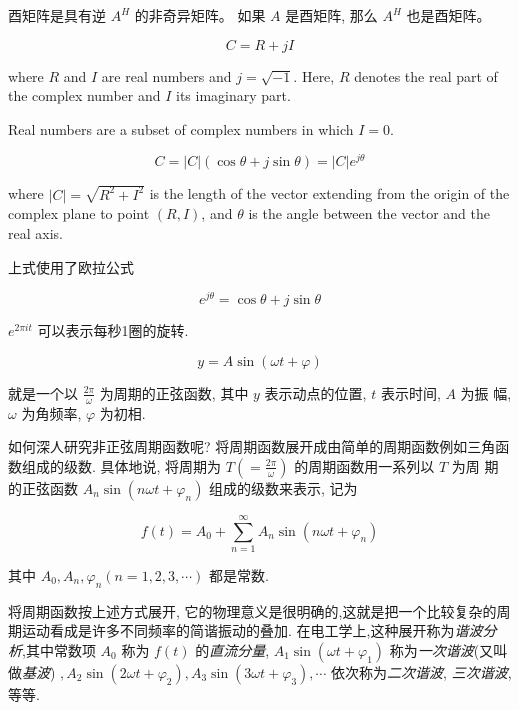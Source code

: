 酉矩阵是具有逆 $ A^{H} $ 的非奇异矩阵。 如果 $ A $ 是酉矩阵, 那么 $ A^{H} $ 也是酉矩阵。

\begin{definition}
    $$ C=R+j I $$

    where $ R $ and $ I $ are real numbers and $ j=\sqrt{-1} $. Here, $ R $ denotes the real part of the complex number and $ I $ its imaginary part. 
    
    Real numbers are a subset of complex numbers in which $I = 0$.
\end{definition}

\begin{definition}
    $$ C=|C|(\cos \theta+j \sin \theta) = |C| e^{j \theta} $$
    
    where $ |C|=\sqrt{R^{2}+I^{2}} $ is the length of the vector extending from the origin of the complex plane to point $ (R, I) $, and $ \theta $ is the angle between the vector and the real axis.
\end{definition}

上式使用了欧拉公式

\begin{theorem}
    $$ e^{j \theta}=\cos \theta+j \sin \theta $$
\end{theorem}

\begin{corollary}
    $e^{2 \pi it}$ 可以表示每秒1圈的旋转. 
\end{corollary}

\begin{definition}[正弦函数]
    $$ y=A \sin (\omega t+\varphi) $$

    就是一个以 $ \frac{2 \pi}{\omega} $ 为周期的正弦函数, 其中 $ y $ 表示动点的位置, $ t $ 表示时间, $ A $ 为振 幅, $ \omega $ 为角频率, $ \varphi $ 为初相.
\end{definition}

如何深人研究非正弦周期函数呢? 将周期函数展开成由简单的周期函数例如三角函数组成的级数. 具体地说, 将周期为 $ T\left(=\frac{2 \pi}{\omega}\right) $ 的周期函数用一系列以 $ T $ 为周 期的正弦函数 $ A_{n} \sin \left(n \omega t+\varphi_{n}\right) $ 组成的级数来表示, 记为

$$ f(t)=A_{0}+\sum_{n=1}^{\infty} A_{n} \sin \left(n \omega t+\varphi_{n}\right) $$

其中 $ A_{0}, A_{n}, \varphi_{n}(n=1,2,3, \cdots) $ 都是常数.

将周期函数按上述方式展开, 它的物理意义是很明确的,这就是把一个比较复杂的周期运动看成是许多不同频率的简谐振动的叠加. 在电工学上,这种展开称为\textit{谐波分析},其中常数项 $ A_{0} $ 称为 $ f(t) $ 的\textit{直流分量}, $ A_{1} \sin \left(\omega t+\varphi_{1}\right) $ 称为\textit{一次谐波}(又叫做\textit{基波}) $ , A_{2} \sin \left(2 \omega t+\varphi_{2}\right), A_{3} \sin \left(3 \omega t+\varphi_{3}\right), \cdots $ 依次称为\textit{二次谐波}, \textit{三次谐波},等等.

